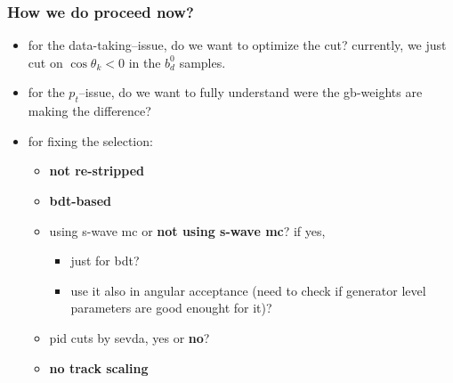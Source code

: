 \documentclass[9pt,xcolor={table,svgnames},aspectratio=43]{beamer}
\begin{document}
\begin{frame}
\frametitle{How we do proceed now?}

\begin{itemize}
  \item for the data-taking--issue, do we want to optimize the cut? currently,
    we just cut on $\cos \theta_k < 0$ in the $b_d^0$ samples.
  \item for the $p_t$--issue, do we want to fully understand were the gb-weights
    are making the difference?
  \item for fixing the selection:
    \begin{itemize}
      \item \textbf{not re-stripped} %
      \item \textbf{bdt-based} %
      \item using s-wave mc or \textbf{not using s-wave mc}? if yes,
        \begin{itemize}
          \item just for bdt?
          \item use it also in angular acceptance (need to check if generator
            level parameters are good enought for it)?
        \end{itemize}
      \item pid cuts by sevda, yes or \textbf{no}?
      \item \textbf{no track scaling}
    \end{itemize}
\end{itemize}

\end{frame}
\end{document}
